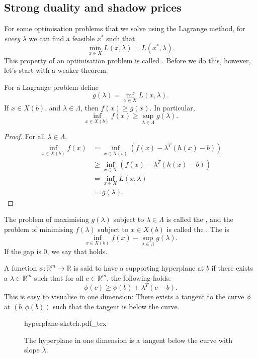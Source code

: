 \documentclass[a4paper]{scrartcl}
\newcommand{\incfig}[2]{%
    \def\svgwidth{#1mm}
    {#2.pdf_tex}
}
\begin{document}
\subsection{Strong duality and shadow prices}
For some optimisation problems that we solve using the Lagrange method, for \emph{every} $\lambda$ we can find a feasible $x^*$ such that 
\[\min_{x \in X} L (x, \lambda)=L(x^*,\lambda).\]
This property of an optimisation problem is called .
Before we do this, however, let's start with a weaker theorem.
\begin{theorem}
	 For a Lagrange problem define 
	 \[g (\lambda)=\inf_{x \in X}L (x,\lambda).\]
	 If $x \in X (b)$, and $\lambda \in \Lambda$, then $f (x)\geq g (x)$. In particular,
	 \[\inf_{x \in X(b)}f(x) \geq \sup_{\lambda \in \Lambda}g (\lambda).\]
\end{theorem}
\begin{proof}
	For all $\lambda \in \Lambda$,
	 \begin{equation*}
		  \begin{split}
			\inf_{x \in X(b)}f(x)&=\inf_{x \in X(b)}(f(x)- \lambda^T (h(x)-b))\\
			&\geq \inf_{x \in X}(f(x)- \lambda^T (h(x)-b))\\
			&=\inf_{x \in X}L (x,\lambda)\\
			&=g (\lambda).
		  \end{split}
	 \end{equation*}
	 
\end{proof}

The problem of maximising $g (\lambda)$ subject to $\lambda \in \Lambda$ is called the , and the problem of minimising $f (\lambda)$ subject to $x \in X(b)$ is called the .\newline 
The  is 
\[\inf_{x \in X(b)}f(x)- \sup_{\lambda \in \Lambda}g (\lambda).\]
If the gap is 0, we say that  holds.
\begin{definition}[Hyperplane]
	 A function $\phi: \mathbb{R}^{m} \to \mathbb{R} $ is said to have a supporting hyperplane at $b$ if there exists a $\lambda \in \mathbb{R}^{m}$ such that for all $c \in \mathbb{R}^{m} $, the following holds: 
	 \[\phi(c)\geq \phi (b)+ \lambda^T (c-b).\]
	 This is easy to visualise in one dimension: There exists a tangent to the curve $\phi$ at $(b,\phi(b))$ such that the tangent is below the curve.
	 \begin{figure}[H]
		\centering
		\incfig{70}{hyperplane-sketch}
		\caption{The hyperplane in one dimension is a tangent below the curve with slope $\lambda$.}
	\end{figure}
\end{definition}
\end{document}
